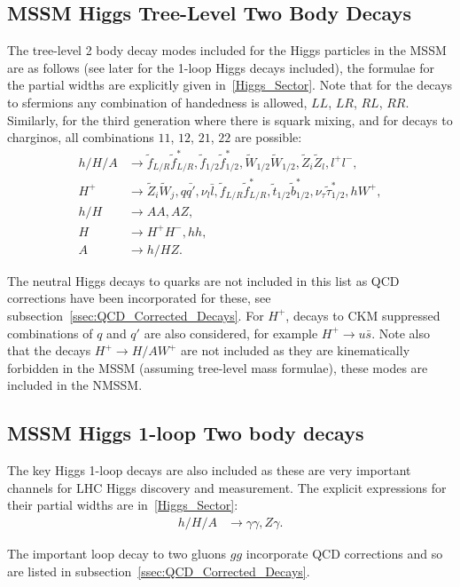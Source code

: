 \documentclass[final,3p,times]{elsarticle}
\begin{document}
\subsection{MSSM Higgs Tree-Level Two Body Decays}
The tree-level 2 body decay modes included for the Higgs particles in the
MSSM are as follows (see later for the 1-loop Higgs decays included), the
formulae for the partial widths are explicitly given in~\ref{Higgs_Sector}. Note that for the decays to sfermions any combination of handedness
is allowed, $LL$, $LR$, $RL$, $RR$. Similarly, for the third generation where
there is squark mixing, and for decays to charginos, all combinations $11$,
$12$, $21$, $22$ are possible: 
\begin{align*}
h/H/A &\rightarrow \tilde{f}_{L/R} \tilde{f}_{L/R}^*, \tilde{f}_{1/2} \tilde{f}_{1/2}^*, \tilde{W}_{1/2} \tilde{W}_{1/2}, \tilde{Z}_{i} \tilde{Z}_{l}, l^+ l^-, \\
H^+ &\rightarrow \tilde{Z}_{i} \tilde{W}_{j}, q \bar{q'}, \nu_{l} \bar{l}, \tilde{f}_{L/R} \tilde{f}_{L/R}^*, \tilde{t}_{1/2} \tilde{b}_{1/2}^*, \nu_{\tau} \tilde{\tau}_{1/2}^*, h W^+,\\
h/H &\rightarrow A A, A Z, \\
H &\rightarrow H^+ H^-, hh, \\
A &\rightarrow h/H Z.
\end{align*}

The neutral Higgs decays to quarks are not included in this list as QCD corrections have been incorporated for these, see subsection~\ref{ssec:QCD_Corrected_Decays}.
For $H^+$, decays to CKM suppressed combinations of $q$ and $q'$ are also considered, for example $H^+ \rightarrow u \bar{s}$. Note also that the decays $H^+ \rightarrow H/A W^+$ are not included as they are kinematically forbidden in the MSSM (assuming tree-level mass formulae), these modes are included in the NMSSM.

\subsection{MSSM Higgs 1-loop Two body decays}
The key Higgs 1-loop decays are also included as these are very important 
channels for LHC Higgs discovery and measurement. The explicit expressions for
their partial widths are in~\ref{Higgs_Sector}:
\begin{align*}
h/H/A &\rightarrow \gamma\gamma, Z\gamma.
\end{align*}

The important loop decay to two gluons $gg$ incorporate QCD corrections and so are listed in  subsection~\ref{ssec:QCD_Corrected_Decays}.
\end{document}

